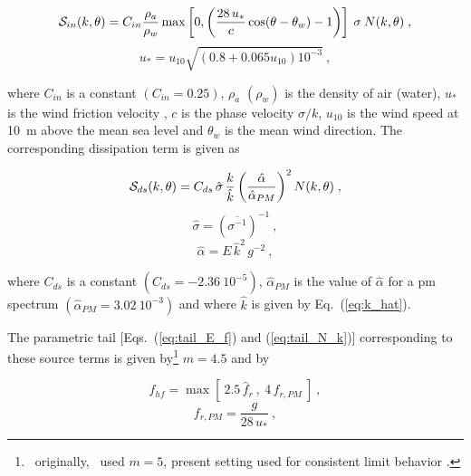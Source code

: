 
\begin{equation}
{\cal S}_{in}(k,\theta) = C_{in} \frac{\rho_a}{\rho_w} \max
\left [ 0 , \left (
\frac{28 \, u_\ast}{c} \cos ( \theta - \theta_w ) - 1
\right ) \right ]
\: \sigma \: N(k,\theta) \; , \label{eq:Snyder}
\end{equation}
\begin{equation}
u_\ast = u_{10} \sqrt{(0.8 + 0.065u_{10})10^{-3}}
\: , \label{eq:Wu}
\end{equation}

\noindent
where $C_{in}$ is a constant $(C_{in} = 0.25)$, $\rho_a$ $(\rho_w)$ is the
density of air (water), $u_\ast$ is the wind friction velocity
\citep{art:Cha55,art:Wu82}, $c$ is the phase velocity $\sigma/k$, $u_{10}$ is
the wind speed at 10~m above the mean sea level and $\theta_w$ is the mean
wind direction. The corresponding dissipation term is given as


\begin{equation}
{\cal S}_{ds}(k,\theta) = C_{ds} \, \hat{\sigma} \, \frac{k}{\hat{k}}
\left ( \frac{\hat{\alpha}}{\hat{\alpha}_{PM}} \right ) ^2
N(k,\theta) \; , \label{eq:Snyder_ds}
\end{equation}
\begin{equation}
\hat{\sigma} = \left ( \overline{\sigma^{-1}} \right) ^{-1} \: ,
\label{eq:sigma_hat}
\end{equation}
\begin{equation}
\hat{\alpha} = E \, \hat{k}^2 \,g^{-2} \: ,
\label{eq:alpha_hat}
\end{equation}

\noindent
where $C_{ds}$ is a constant $(C_{ds} = -2.36 \: 10^{-5})$,
$\hat{\alpha}_{PM}$ is the value of $\hat{\alpha}$ for a {\sc pm} spectrum
$(\hat{\alpha}_{PM} = 3.02\:10^{-3})$ and where $\hat{k}$ is given by
Eq.~(\ref{eq:k_hat}).

The parametric tail [Eqs.~(\ref{eq:tail_E_f}) and (\ref{eq:tail_N_k})]
corresponding to these source terms is given by\footnote{~originally, \wam\
used $m = 5$, present setting used for consistent limit behavior
\cite[e.g.,][]{tol:JPO92}.} $m = 4.5$ and by


\begin{equation}
f_{hf} = \max \left [ \: 2.5 \, \hat{f}_r \: , \: 4 \,
f_{r,PM} \: \right ] \: ,
\label{eq:tail_WAM3}
\end{equation}
\begin{equation}
f_{r,PM} = \frac{g}{28 \, u_\ast} \: ,
\label{eq:f_PM}
\end{equation}

